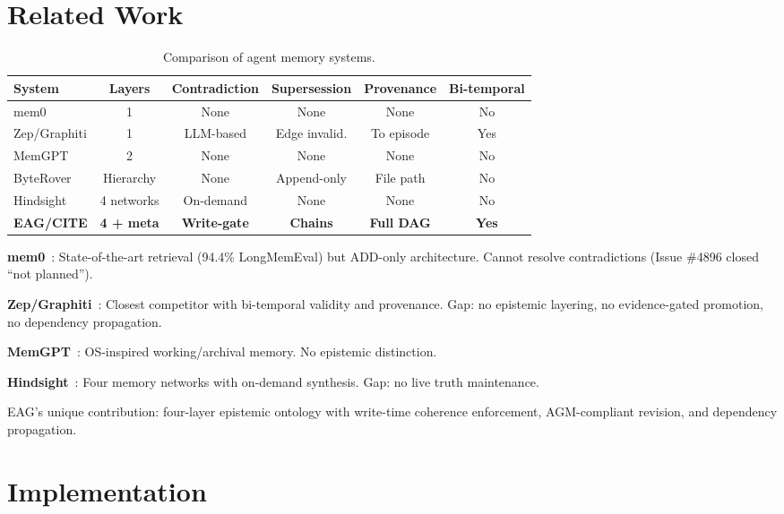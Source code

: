 \documentclass[11pt,letterpaper]{article}
\begin{document}
\section{Related Work}

\begin{table}[H]
\centering
\caption{Comparison of agent memory systems.}
\label{tab:comparison}
\begin{tabular}{@{}lccccc@{}}
\toprule
\textbf{System} & \textbf{Layers} & \textbf{Contradiction} & \textbf{Supersession} & \textbf{Provenance} & \textbf{Bi-temporal} \\
\midrule
mem0 & 1 & None & None & None & No \\
Zep/Graphiti & 1 & LLM-based & Edge invalid. & To episode & Yes \\
MemGPT & 2 & None & None & None & No \\
ByteRover & Hierarchy & None & Append-only & File path & No \\
Hindsight & 4 networks & On-demand & None & None & No \\
\textbf{EAG/CITE} & \textbf{4 + meta} & \textbf{Write-gate} & \textbf{Chains} & \textbf{Full DAG} & \textbf{Yes} \\
\bottomrule
\end{tabular}
\end{table}

\textbf{mem0}~\cite{mem0}: State-of-the-art retrieval (94.4\% LongMemEval) but ADD-only architecture. Cannot resolve contradictions (Issue \#4896 closed ``not planned'').

\textbf{Zep/Graphiti}~\cite{graphiti2025}: Closest competitor with bi-temporal validity and provenance. Gap: no epistemic layering, no evidence-gated promotion, no dependency propagation.

\textbf{MemGPT}~\cite{memgpt2023}: OS-inspired working/archival memory. No epistemic distinction.

\textbf{Hindsight}~\cite{hindsight}: Four memory networks with on-demand synthesis. Gap: no live truth maintenance.

EAG's unique contribution: four-layer epistemic ontology with write-time coherence enforcement, AGM-compliant revision, and dependency propagation.

\section{Implementation}
\end{document}
